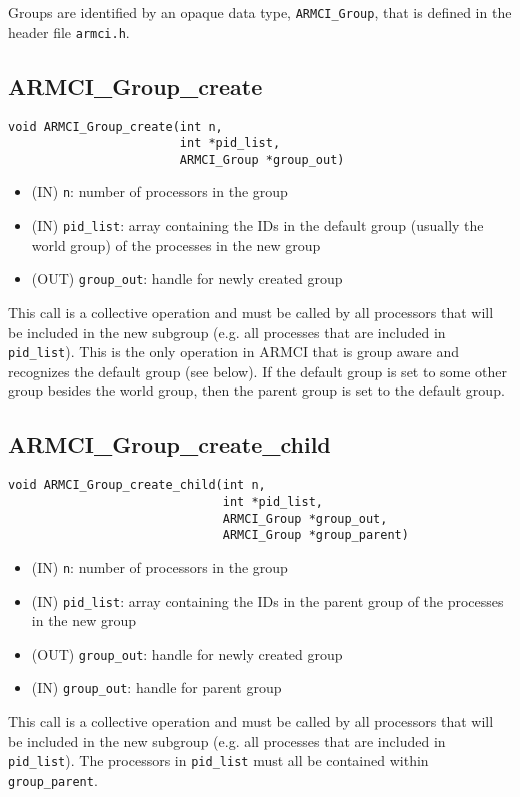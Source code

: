 \documentclass[12pt]{article}
\begin{document}
Groups are identified by an opaque data type, \texttt{ARMCI\_Group}, that is
defined in the header file \texttt{armci.h}.

\subsection{ARMCI\_Group\_create}
\begin{verbatim}
void ARMCI_Group_create(int n,
                        int *pid_list,
                        ARMCI_Group *group_out)
\end{verbatim}
\begin{itemize}
\item (IN) \texttt{n}: number of processors in the group
\item (IN) \texttt{pid\_list}: array containing the IDs in the default group
(usually the world group) of the processes in the new group
\item (OUT) \texttt{group\_out}: handle for newly created group
\end{itemize}
This call is a collective operation and must be called by all processors that
will be included in the new subgroup (e.g. all processes that are included in
\texttt{pid\_list}). This is the only operation in ARMCI that is group aware and
recognizes the default group (see below). If the default group is set to some
other group besides the world group, then the parent group is set to the default
group.

\subsection{ARMCI\_Group\_create\_child}
\begin{verbatim}
void ARMCI_Group_create_child(int n,
                              int *pid_list,
                              ARMCI_Group *group_out,
                              ARMCI_Group *group_parent)
\end{verbatim}
\begin{itemize}
\item (IN) \texttt{n}: number of processors in the group
\item (IN) \texttt{pid\_list}: array containing the IDs in the parent group
of the processes in the new group
\item (OUT) \texttt{group\_out}: handle for newly created group
\item (IN) \texttt{group\_out}: handle for parent group
\end{itemize}
This call is a collective operation and must be called by all processors that
will be included in the new subgroup (e.g. all processes that are included in
\texttt{pid\_list}). The processors in \texttt{pid\_list} must all be contained
within \texttt{group\_parent}.
\end{document}
